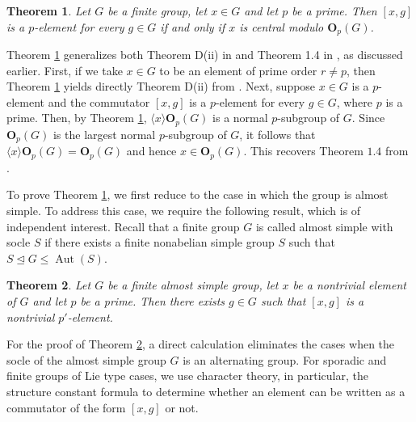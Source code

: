 \documentclass[twoside,a4paper,reqno,12pt]{amsart}
\newcommand{\<}{\langle}
\renewcommand{\>}{\rangle}
\newcommand{\la}{\langle}
\newcommand{\ra}{\rangle}
\newcommand{\leqs}{\leqslant}
\newcommand{\Aut}{\operatorname{Aut}}
\newcommand{\OB}{\mathbf{O}}
\renewcommand{\leq}{\leqs}
\renewcommand{\:}{\colon}
\newtheorem{thm}{Theorem}[section]
\theoremstyle{definition}
\begin{document}
\begin{thm}\label{th:r-elements-commutators}
Let $G$ be a finite group, let $x\in G$ and let $p$ be a prime. Then $[x,g]$ is a $p$-element for every $g\in G$ if and only if $x$ is central modulo $\OB_p(G)$.
\end{thm}



Theorem \ref{th:r-elements-commutators} generalizes  both Theorem D(ii) in \cite{GR} and Theorem 1.4 in \cite{GM1}, as discussed earlier. First, if we take $x\in G$ to be an element of prime order $r\neq p$, then  Theorem  \ref{th:r-elements-commutators} yields directly Theorem D(ii) from \cite{GR}. Next, suppose  $x\in G$ is a $p$-element and the commutator $[x,g]$ is a $p$-element for every $g\in G$, where $p$ is a prime. Then, by Theorem \ref{th:r-elements-commutators},  $\la x\ra \OB_p(G)$ is a normal $p$-subgroup of $G$. Since $\OB_p(G)$ is the largest normal $p$-subgroup of $G$, it follows that $\la x\ra \OB_p(G)=\OB_p(G)$ and hence  $x\in \OB_p(G)$. This recovers Theorem $1.4$ from \cite{GM1}.



To prove Theorem \ref{th:r-elements-commutators}, we first reduce to the case in which the group is almost simple. To address this case, we require the following result, which is of independent interest. Recall that a finite group $G$ is called almost simple with socle $S$ if there exists  a finite nonabelian simple group $S$ such that $S\unlhd G\leq \Aut(S)$.

\begin{thm}\label{th:r-singular}
Let $G$ be a finite almost simple group, let $x$ be a nontrivial element of $G$ and let $p$ be a prime. Then  there exists $g\in G$ such that $[x,g]$ is a nontrivial $p'$-element.
\end{thm}

 For the proof of Theorem \ref{th:r-singular},  a direct calculation eliminates the cases when the socle of the almost simple group $G$ is an alternating group. For sporadic  and finite  groups of Lie type cases, we use character theory, in particular, the structure constant formula to determine whether an element can be written as a commutator of the form $[x,g]$ or not. 
\end{document}
